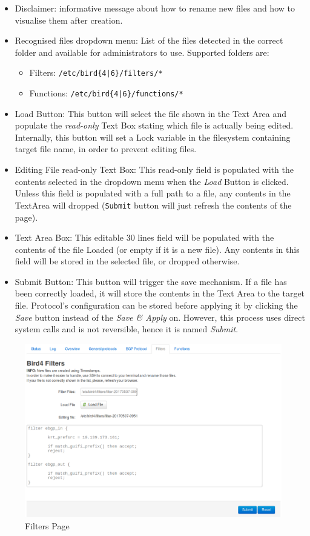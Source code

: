 \begin{itemize}
    \item Disclaimer: informative message about how to rename new files and how to visualise them after creation.
    \item Recognised files dropdown menu: List of the files detected in the correct folder and available for administrators to use. Supported folders are:
    \begin{itemize}
        \item Filters: \texttt{/etc/bird\{4|6\}/filters/*}
        \item Functions: \texttt{/etc/bird\{4|6\}/functions/*}
    \end{itemize}
    \item Load Button: This button will select the file shown in the Text Area and populate the \textit{read-only} Text Box stating which file is actually being edited. Internally, this button will set a Lock variable in the filesystem containing target file name, in order to prevent editing files.
    \item Editing File read-only Text Box: This read-only field is populated with the contents selected in the dropdown menu when the \textit{Load} Button is clicked. Unless this field is populated with a full path to a file, any contents in the TextArea will dropped (\texttt{Submit} button will just refresh the contents of the page).
    \item Text Area Box: This editable 30 lines field will be populated with the contents of the file Loaded (or empty if it is a new file). Any contents in this field will be stored in the selected file, or dropped otherwise.
    \item Submit Button: This button will trigger the save mechanism. If a file has been correctly loaded, it will store the contents in the Text Area to the target file. Protocol's configuration can be stored before applying it by clicking the \textit{Save} button instead of the \textit{Save \& Apply} on. However, this process uses direct system calls and is not reversible, hence it is named \textit{Submit}.
\end{itemize}

\begin{figure}[H]
    \centering
    \includegraphics[width=\textwidth]{images/bird0.3/filters}
    \caption{Filters Page}
    \label{fig:filtersp}
\end{figure}


